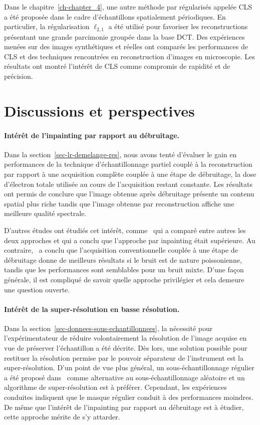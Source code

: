 Dans le chapitre~\ref{ch-chapter_4}, une autre méthode par  régularisés appelée CLS a été proposée dans le cadre d'échantillons spatialement périodiques. En particulier, la régularisation $\ell_{2,1}$ a été utilisé pour favoriser les reconstructions présentant une grande parcimonie groupée dans la base DCT. Des expériences menées sur des images synthétiques et réelles ont comparés les performances de CLS et des techniques rencontrées en reconstruction d'images en microscopie. Les résultats ont montré l'intérêt de CLS comme compromis de rapidité et de précision.


\section*{Discussions et perspectives}

\paragraph{Intérêt de l'inpainting par rapport au débruitage.} Dans la section~\ref{sec-lr-demelange-res}, nous avons tenté d'évaluer le gain en performances de la technique d'échantillonnage partiel couplé à la reconstruction par rapport à une acquisition complète couplée à une étape de débruitage, la dose d'électron totale utilisée au cours de l'acquisition restant constante. Les résultats ont permis de conclure que l'image obtenue après débruitage présente un contenu spatial plus riche tandis que l'image obtenue par reconstruction affiche une meilleure qualité spectrale.

D'autres études ont étudiés cet intérêt, comme~\cite{trampert2018ultramicroscopy} qui a comparé entre autres les deux approches et qui a conclu que l'approche par inpainting était supérieure. Au contraire,~\cite{sanders2018inpainting} a conclu que l'acquisition conventionnelle couplée à une étape de débruitage donne de meilleurs résultats si le bruit est de nature poissonienne, tandis que les performances sont semblables pour un bruit mixte. D'une façon générale, il est compliqué de savoir quelle approche privilégier et cela demeure une question ouverte.

\paragraph{Intérêt de la super-résolution en basse résolution.} Dans la section~\ref{sec-donnees-sous-echantillonnees}, la nécessité pour l'expérimentateur de réduire volontairement la résolution de l'image acquise en vue de préserver l'échantillon a été décrite. Dès lors, une solution possible pour restituer la résolution permise par le pouvoir séparateur de l'instrument est la super-résolution. D'un point de vue plus général, un sous-échantillonnage régulier a été proposé dans~\cite{trampert2018ultramicroscopy} comme alternative au sous-échantillonnage aléatoire et un algorithme de super-résolution est à préférer. Cependant, les expériences conduites indiquent que le masque régulier conduit à des performances moindres. De même que l'intérêt de l'inpainting par rapport au débruitage est à étudier, cette approche mérite de s'y attarder.

